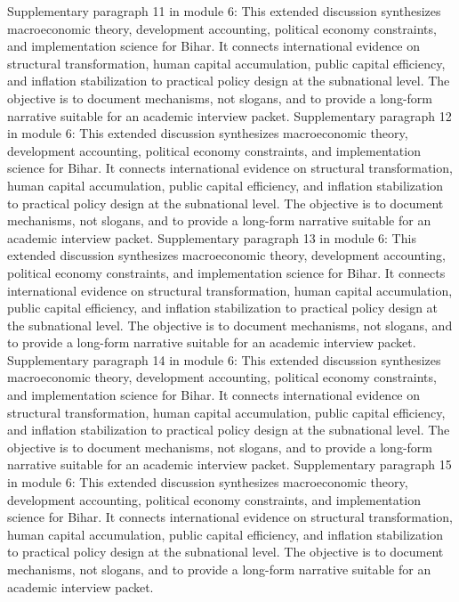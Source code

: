 \documentclass[preprint,12pt]{elsarticle}
\begin{document}
Supplementary paragraph 11 in module 6: This extended discussion synthesizes macroeconomic theory, development accounting, political economy constraints, and implementation science for Bihar. It connects international evidence on structural transformation, human capital accumulation, public capital efficiency, and inflation stabilization to practical policy design at the subnational level. The objective is to document mechanisms, not slogans, and to provide a long-form narrative suitable for an academic interview packet.
Supplementary paragraph 12 in module 6: This extended discussion synthesizes macroeconomic theory, development accounting, political economy constraints, and implementation science for Bihar. It connects international evidence on structural transformation, human capital accumulation, public capital efficiency, and inflation stabilization to practical policy design at the subnational level. The objective is to document mechanisms, not slogans, and to provide a long-form narrative suitable for an academic interview packet.
Supplementary paragraph 13 in module 6: This extended discussion synthesizes macroeconomic theory, development accounting, political economy constraints, and implementation science for Bihar. It connects international evidence on structural transformation, human capital accumulation, public capital efficiency, and inflation stabilization to practical policy design at the subnational level. The objective is to document mechanisms, not slogans, and to provide a long-form narrative suitable for an academic interview packet.
Supplementary paragraph 14 in module 6: This extended discussion synthesizes macroeconomic theory, development accounting, political economy constraints, and implementation science for Bihar. It connects international evidence on structural transformation, human capital accumulation, public capital efficiency, and inflation stabilization to practical policy design at the subnational level. The objective is to document mechanisms, not slogans, and to provide a long-form narrative suitable for an academic interview packet.
Supplementary paragraph 15 in module 6: This extended discussion synthesizes macroeconomic theory, development accounting, political economy constraints, and implementation science for Bihar. It connects international evidence on structural transformation, human capital accumulation, public capital efficiency, and inflation stabilization to practical policy design at the subnational level. The objective is to document mechanisms, not slogans, and to provide a long-form narrative suitable for an academic interview packet.
\end{document}

